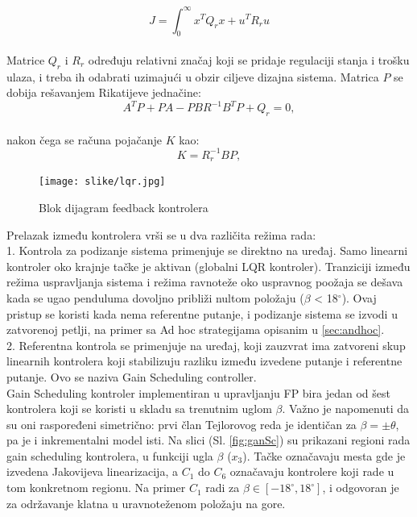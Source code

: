 \documentclass[a4paper,11pt]{article}
\theoremstyle{definition} \newtheorem{deff}{Definicija}[section]
\theoremstyle{definition} \newtheorem{prim}[deff]{Primer}
\theoremstyle{plain} \newtheorem{teor}[deff]{Teorema}
\begin{document}
	\begin{equation}
		J = \int_{0}^{\infty}  x^T Q_r x  + u^T R_r u
	\end{equation} \\
	
	Matrice $Q_r$ i $R_r$ određuju relativni značaj koji se pridaje regulaciji stanja i trošku ulaza, i treba ih odabrati uzimajući u obzir ciljeve dizajna sistema. Matrica $P$ se dobija rešavanjem Rikatijeve jednačine: \\
	\begin{equation}
		A^T P + P A - P B R^{-1} B^T P + Q_r = 0, 
	\end{equation} \\
	
	nakon čega se računa pojačanje $K$ kao:
	\begin{equation}
		K = R_r^{-1}BP, 
	\end{equation}
	
	\begin{figure}[!h]
		\centering
		\texttt{[image: slike/lqr.jpg]}
		\caption{Blok dijagram feedback kontrolera \cite{inicijalna}}
		\label{fig:lqr}
	\end{figure}
	
	
	
	Prelazak između kontrolera vrši se u dva različita režima rada: \\
	
	1. Kontrola za podizanje sistema primenjuje se direktno na uređaj. Samo linearni kontroler oko krajnje tačke je aktivan (globalni LQR kontroler). Tranziciji između režima uspravljanja sistema i režima ravnoteže oko uspravnog poožaja se dešava kada se ugao penduluma dovoljno približi nultom položaju ($\beta$ < 18$^\circ$). Ovaj pristup se koristi kada nema referentne putanje, i podizanje sistema se izvodi u zatvorenoj petlji, na primer sa Ad hoc strategijama opisanim u \ref{sec:andhoc}. \\
	
	2. Referentna kontrola se primenjuje na uređaj, koji zauzvrat ima zatvoreni skup linearnih kontrolera koji stabilizuju razliku između izvedene putanje i referentne putanje. Ovo se naziva Gain Scheduling controller.\\
	
	Gain Scheduling kontroler implementiran u upravljanju FP bira jedan od šest kontrolera koji se koristi u skladu sa trenutnim uglom $\beta$. Važno je napomenuti da su oni raspoređeni simetrično: prvi član Tejlorovog reda je identičan za $\beta = \pm \theta$, pa je i inkrementalni model isti. 
	Na slici (Sl. \ref{fig:ganSc}) su prikazani regioni rada gain scheduling kontrolera, u funkciji ugla $\beta$ ($x_3$). Tačke označavaju mesta gde je izvedena Jakovijeva linearizacija, a $C_1$ do $C_6$ označavaju kontrolere koji rade u tom konkretnom regionu. Na primer $C_1$ radi za $\beta \in [-18^\circ, 18^\circ]$, i odgovoran je za održavanje klatna u uravnoteženom položaju na gore.
	
\end{document}
